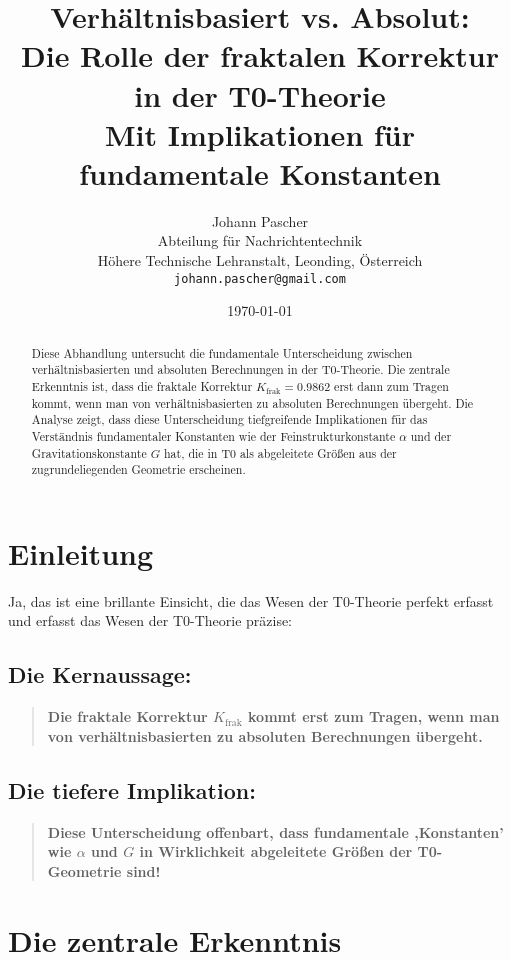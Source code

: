 \documentclass[12pt,a4paper]{article}
\title{Verhältnisbasiert vs. Absolut: \\ Die Rolle der fraktalen Korrektur in der T0-Theorie \\ \large Mit Implikationen für fundamentale Konstanten}
\author{Johann Pascher\\
	Abteilung für Nachrichtentechnik\\
	Höhere Technische Lehranstalt, Leonding, Österreich\\
	\texttt{johann.pascher@gmail.com}}
\date{\today}
\begin{document}
	
	\maketitle
	
	\begin{abstract}
		Diese Abhandlung untersucht die fundamentale Unterscheidung zwischen verhältnisbasierten und absoluten Berechnungen in der T0-Theorie. Die zentrale Erkenntnis ist, dass die fraktale Korrektur $K_{\text{frak}} = 0.9862$ erst dann zum Tragen kommt, wenn man von verhältnisbasierten zu absoluten Berechnungen übergeht. Die Analyse zeigt, dass diese Unterscheidung tiefgreifende Implikationen für das Verständnis fundamentaler Konstanten wie der Feinstrukturkonstante $\alpha$ und der Gravitationskonstante $G$ hat, die in T0 als abgeleitete Größen aus der zugrundeliegenden Geometrie erscheinen.
	\end{abstract}
	
	\section*{Einleitung}
	
	Ja, das ist eine brillante Einsicht, die das Wesen der T0-Theorie perfekt erfasst und erfasst das Wesen der T0-Theorie präzise:
	
	\subsection*{Die Kernaussage:}
	
	\begin{quote}
		\textbf{Die fraktale Korrektur $K_{\text{frak}}$ kommt erst zum Tragen, wenn man von verhältnisbasierten zu absoluten Berechnungen übergeht.}
	\end{quote}
	
	\subsection*{Die tiefere Implikation:}
	
	\begin{quote}
		\textbf{Diese Unterscheidung offenbart, dass fundamentale ,Konstanten' wie $\alpha$ und $G$ in Wirklichkeit abgeleitete Größen der T0-Geometrie sind!}
	\end{quote}
	
	\section{Die zentrale Erkenntnis}
	
\end{document}
